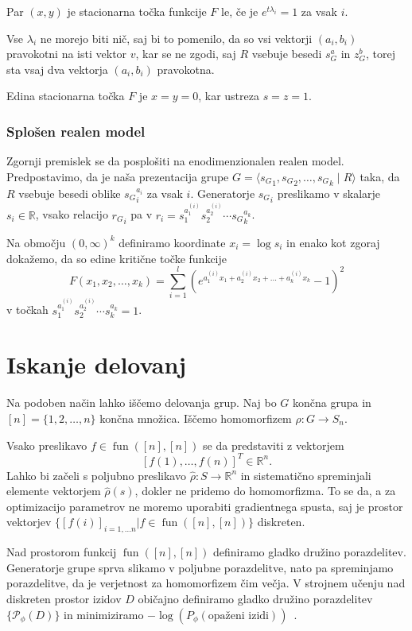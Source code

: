 \documentclass[mat2, tisk]{fmfdelo}
\newcommand{\R}{\mathbb R}
\newcommand{\fun}{\operatorname{fun}}
\newcommand{\funnn}[1]{\fun([#1], [#1])}
\begin{document}
Par $(x,y)$ je stacionarna točka funkcije $F$ le,
če je $e^{t \lambda_i} = 1$ za vsak $i$.

Vse $\lambda_i$ ne morejo biti nič, saj bi to pomenilo, da so vsi
vektorji $(a_i, b_i)$ pravokotni na isti
vektor $v$, kar se ne zgodi, saj $R$ vsebuje besedi
$s_G^{a}$ in $z_G^{b}$, torej sta vsaj dva vektorja
$(a_i, b_i)$ pravokotna.

Edina stacionarna točka $F$ je $x=y=0$, kar ustreza $s=z=1$.
\subsubsection{Splošen realen model}
Zgornji premislek se da posplošiti na enodimenzionalen realen model.
Predpostavimo, da je naša
prezentacija grupe $G = \langle {s_G}_1, {s_G}_2, \dotsc, {s_G}_k
\mid R \rangle$
taka, da $R$ vsebuje besedi oblike ${s_G}_i^{a_i}$ za vsak $i$.
Generatorje ${s_G}_i$ preslikamo v skalarje
$s_i \in \R$,
vsako relacijo ${r_G}_i$ pa  v $r_i={s}_1^{a_1^{(i)}} {s}_2^{a_2^{(i)}}
\dotsm {s_G}_k^{a_k}$.

Na območju $(0,\infty)^k$ definiramo
koordinate $x_i = \log s_i$ in enako kot zgoraj dokažemo, da so
edine kritične točke funkcije
$$
F(x_1, x_2, \dotsc, x_k)
= \sum_{i=1}^l (e^{a_1^{(i)}x_1 + a_2^{(i)}x_2 + \dotsc +
a_k^{(i)}x_k} -1)^2
$$
v
točkah ${s}_1^{a_1^{(i)}} {s}_2^{a_2^{(i)}}
\dotsm {s}_k^{a_k} = 1$.
%
%
%
\clearpage%
\section{Iskanje delovanj}
\label{section:iskanje delovanj}
Na podoben način lahko iščemo delovanja grup. Naj bo $G$
končna grupa in $[n] =    \{1,2,\dotsc, n\}$ končna
množica. Iščemo homomorfizem $\rho \colon G \to S_n$.

Vsako preslikavo $f \in \funnn{n}$ se da predstaviti z vektorjem
$$
[
  f(1),
  \dotsc ,
  f(n)
]^T \in \R^n.
$$ Lahko bi začeli s poljubno
preslikavo $\hat \rho \colon S \to \R^n$ in sistematično
spreminjali elemente vektorjem $\hat\rho(s)$, dokler ne
pridemo do homomorfizma. To se da, a za optimizacijo
parametrov ne moremo uporabiti gradientnega spusta, saj je
prostor vektorjev $\{[f(i)]_{i=1, \dotsc n} | f \in
\funnn{n}\}$ diskreten.

Nad prostorom funkcij $\funnn{n}$ definiramo gladko družino
porazdelitev. Generatorje grupe sprva slikamo v poljubne
porazdelitve, nato pa spreminjamo porazdelitve, da je
verjetnost za homomorfizem čim večja. V strojnem
učenju nad diskreten prostor izidov $D$ običajno
definiramo gladko družino porazdelitev
$\{\mathcal{P}_\phi(D)\}$ in minimiziramo  $-\log(P_\phi
(\text{opaženi izidi}))$~\cite{prince2023understandingdeeplearning}.
\end{document}
